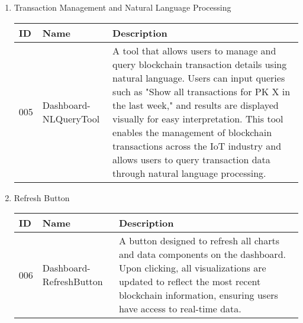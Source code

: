 \documentclass[conference]{IEEEtran}
\begin{document}
\begin{enumerate}[itemsep=2ex, parsep=1ex]
\begin{enumerate}[itemsep=2ex, parsep=1ex]
	      	\item Transaction Management and Natural Language Processing
	      	      \begin{table}[h!]
	      	      	\def\arraystretch{1.24} \small
	      	      	\begin{tabular}{|p{1.2cm}|p{2.5cm}|p{4.0cm}|}
	      	      		\hline
	      	      		ID  & Name                  & Description                                                                                                                                                                                                                                                                                                                                                                                                            \\
	      	      		\hline
	      	      		005 & Dashboard-NLQueryTool & A tool that allows users to manage and query blockchain transaction details using natural language. Users can input queries such as "Show all transactions for PK X in the last week," and results are displayed visually for easy interpretation. This tool enables the management of blockchain transactions across the IoT industry and allows users to query transaction data through natural language processing. \\
	      	      		\hline
	      	      	\end{tabular}
	      	      \end{table}
	      	      
	      	\item Refresh Button
	      	      \begin{table}[h!]
	      	      	\def\arraystretch{1.24} \small
	      	      	\begin{tabular}{|p{1.2cm}|p{2.5cm}|p{4.0cm}|}
	      	      		\hline
	      	      		ID  & Name                    & Description                                                                                                                                                                                                                  \\
	      	      		\hline
	      	      		006 & Dashboard-RefreshButton & A button designed to refresh all charts and data components on the dashboard. Upon clicking, all visualizations are updated to reflect the most recent blockchain information, ensuring users have access to real-time data. \\
	      	      		\hline
	      	      	\end{tabular}
	      	      \end{table}
	      \end{enumerate}
	      

\end{enumerate}
\end{document}
